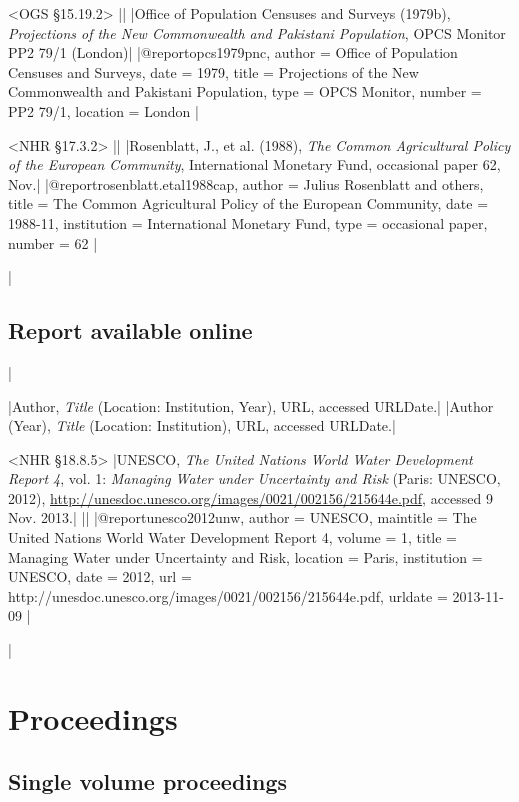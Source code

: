 \documentclass[extrafontsizes,11pt,a4paper,oneside]{memoir}
\newcommand*{\lit}[1]{\textsf{#1}}
\begin{document}
\bibexample<OGS \S15.19.2>
||%
|Office of Population Censuses and Surveys (1979b), \emph{Projections of the New Commonwealth and Pakistani Population}, OPCS Monitor PP2 79/1 (London)|%
|@report{opcs1979pnc,
  author = {{Office of Population Censuses and Surveys}},
  date = {1979},
  title = {Projections of the {New Commonwealth} and {Pakistani} Population},
  type = {OPCS Monitor},
  number = {PP2 79/1},
  location = {London}
}|

\bibexample<NHR \S17.3.2>
||%
|Rosenblatt, J., et al. (1988), \emph{The Common Agricultural Policy of the European Community}, International Monetary Fund, occasional paper 62, Nov.|%
|@report{rosenblatt.etal1988cap,
  author = {Julius Rosenblatt and others},
  title = {The {Common Agricultural Policy} of the {European Community}},
  date = {1988-11},
  institution = {International Monetary Fund},
  type = {occasional paper},
  number = {62}
}|%

\todoc|
\section{Report available online}
|

\specs
|Author, \emph{Title} (Location: Institution, Year), URL, \lit{accessed} URLDate.|%
|Author (Year), \emph{Title} (Location: Institution), URL, \lit{accessed} URLDate.|

\bibexample<NHR \S18.8.5>
|UNESCO, \emph{The United Nations World Water Development Report 4}, vol. 1: \emph{Managing Water under Uncertainty and Risk} (Paris: UNESCO, 2012), \url{http://unesdoc.unesco.org/images/0021/002156/215644e.pdf}, accessed 9 Nov. 2013.|%
||%
|@report{unesco2012unw,
  author = {UNESCO},
  maintitle = {The United Nations World Water Development Report 4},
  volume = {1},
  title = {Managing Water under Uncertainty and Risk},
  location = {Paris},
  institution = {UNESCO},
  date = {2012},
  url = {http://unesdoc.unesco.org/images/0021/002156/215644e.pdf},
  urldate = {2013-11-09}
}|

\todoc|
\chapter{Proceedings}\label{sec:proceedings}

\section{Single volume proceedings}
\end{document}
